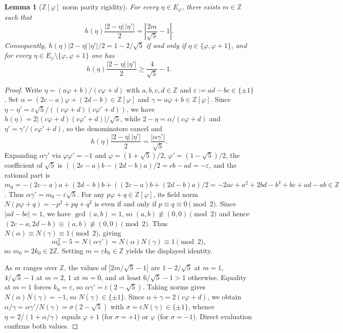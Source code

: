 \documentclass[11pt]{amsart}
\newtheorem{lemma}[theorem]{Lemma}
\theoremstyle{definition}
\theoremstyle{remark}
\numberwithin{equation}{section}
\newcommand{\Z}{\mathbb{Z}}
\begin{document}
\begin{lemma}[{$\Z[\varphi]$ norm parity rigidity}]\label{lem:norm-parity-rigidity}
For every $\eta\in E_\varphi$, there exists $m\in\Z$ such that
\[
 h(\eta)\frac{|2-\eta|\,|\eta'|}{2}=\left|\frac{2m}{\sqrt5}-1\right|.
\]
Consequently, $h(\eta)|2-\eta|\,|\eta'|/2 = 1-2/\sqrt5$ if and only if
$\eta\in\{\varphi,\varphi+1\}$, and for every
$\eta\in E_\varphi\setminus\{\varphi,\varphi+1\}$ one has
\[
 h(\eta)\frac{|2-\eta|\,|\eta'|}{2}\ge \frac{4}{\sqrt5}-1.
\]
\end{lemma}
\begin{proof}
Write $\eta=(a\varphi+b)/(c\varphi+d)$ with $a,b,c,d\in\Z$ and
$\varepsilon:=ad-bc\in\{\pm1\}$. Set
$\alpha=(2c-a)\varphi+(2d-b)\in\Z[\varphi]$ and
$\gamma=a\varphi+b\in\Z[\varphi]$. Since
$\eta-\eta'=\varepsilon\sqrt5/((c\varphi+d)(c\varphi'+d))$, we have
$h(\eta)=2|(c\varphi+d)(c\varphi'+d)|/\sqrt5$, while
$2-\eta=\alpha/(c\varphi+d)$ and $\eta'=\gamma'/(c\varphi'+d)$, so the
denominators cancel and
\[
 h(\eta)\frac{|2-\eta|\,|\eta'|}{2}=\frac{|\alpha\gamma'|}{\sqrt5}.
\]
Expanding $\alpha\gamma'$ via $\varphi\varphi'=-1$ and
$\varphi=(1+\sqrt5)/2$, $\varphi'=(1-\sqrt5)/2$, the coefficient of
$\sqrt5$ is $((2c-a)b-(2d-b)a)/2=cb-ad=-\varepsilon$, and the rational
part is
$m_0=-(2c-a)a+(2d-b)b+((2c-a)b+(2d-b)a)/2=-2ac+a^2+2bd-b^2+bc+ad-ab\in\Z$.
Thus $\alpha\gamma'=m_0-\varepsilon\sqrt5$. For any $p\varphi+q\in\Z[\varphi]$,
its field norm $N(p\varphi+q)=-p^2+pq+q^2$ is even if and only if
$p\equiv q\equiv0\pmod2$. Since $|ad-bc|=1$, we have $\gcd(a,b)=1$, so
$(a,b)\not\equiv(0,0)\pmod2$ and hence
$(2c-a,2d-b)\equiv(a,b)\not\equiv(0,0)\pmod2$. Thus
$N(\alpha)\equiv N(\gamma)\equiv1\pmod2$, giving
\[
 m_0^2-5=N(\alpha\gamma')=N(\alpha)N(\gamma)\equiv1\pmod2,
\]
so $m_0=2k_0\in2\Z$. Setting $m=\varepsilon k_0\in\Z$ yields the displayed
identity.

As $m$ ranges over $\Z$, the values of $|2m/\sqrt5-1|$ are $1-2/\sqrt5$
at $m=1$, $4/\sqrt5-1$ at $m=2$, $1$ at $m=0$, and at least
$6/\sqrt5-1>1$ otherwise. Equality at $m=1$ forces $k_0=\varepsilon$, so
$\alpha\gamma'=\varepsilon(2-\sqrt5)$. Taking norms gives
$N(\alpha)N(\gamma)=-1$, so $N(\gamma)\in\{\pm1\}$. Since
$\alpha+\gamma=2(c\varphi+d)$, we obtain
$\alpha/\gamma=\alpha\gamma'/N(\gamma)=\sigma(2-\sqrt5)$ with
$\sigma=\varepsilon N(\gamma)\in\{\pm1\}$, whence
$\eta=2/(1+\alpha/\gamma)$ equals $\varphi+1$ (for $\sigma=+1$) or
$\varphi$ (for $\sigma=-1$). Direct evaluation confirms both values.
\end{proof}
\end{document}
